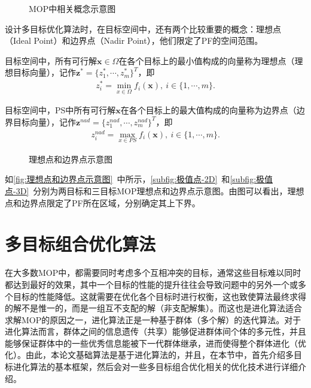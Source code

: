 \begin{figure}[htb]
    \caption{MOP中相关概念示意图}
    \label{fig:MOP中相关概念示意图}
\end{figure}
\par
设计多目标优化算法时，在目标空间中，还有两个比较重要的概念：理想点（Ideal Point）和边界点（Nadir Point），他们限定了PF的空间范围。
\par
\begin{definition}
    \label{def:理想点}
    目标空间中，所有可行解$\mathbf{x} \in \Omega$在各个目标上的最小值构成的向量称为理想点（理想目标向量），记作$\mathbf{z}^* = \{ z_1^*, \cdots, z_m^* \}^T$，即
    \begin{align}
        \label{eq:理想点}
        z_i^* = \min_{x \in \Omega} f_i(\mathbf{x}), \ i \in \{ 1, \cdots, m \}.
    \end{align}
\end{definition}
\par
\begin{definition}
    \label{def:边界点}
    目标空间中，PS中所有可行解$\mathbf{x}$在各个目标上的最大值构成的向量称为边界点（边界目标向量），记作$\mathbf{z}^{nad} = \{ z_1^{nad}, \cdots, z_m^{nad} \}^T$，即
    \begin{align}
        \label{eq:边界点}
        z_i^{nad} = \max_{x \in PS} f_i(\mathbf{x}), \ i \in \{ 1, \cdots, m \}.
    \end{align}
\end{definition}
\par
\begin{figure}[htb]
    \caption{理想点和边界点示意图}
    \label{fig:理想点和边界点示意图}
\end{figure}
\par
如\autoref{fig:理想点和边界点示意图}~中所示，\autoref{subfig:极值点-2D}~和\autoref{subfig:极值点-3D}~分别为两目标和三目标MOP理想点和边界点示意图。由图可以看出，理想点和边界点限定了PF所在区域，分别确定其上下界。

\section{多目标组合优化算法}
\label{sec:背景介绍:多目标组合优化算法}
在大多数MOP中，都需要同时考虑多个互相冲突的目标，通常这些目标难以同时都达到最好的效果，其中一个目标的性能的提升往往会导致问题中的另外一个或多个目标的性能降低。这就需要在优化各个目标时进行权衡，这也致使算法最终求得的解不是惟一的，而是一组互不支配的解（非支配解集）。而这也是进化算法适合求解MOP的原因之一，进化算法正是一种基于群体（多个解）的迭代算法。对于进化算法而言，群体之间的信息遗传（共享）能够促进群体间个体的多元性，并且能够保证群体中的一些优秀信息能被下一代群体继承，进而使得整个群体进化（优化）。由此，本论文基础算法是基于进化算法的，并且，在本节中，首先介绍多目标进化算法的基本框架，然后会对一些多目标组合优化相关的优化技术进行详细介绍。

